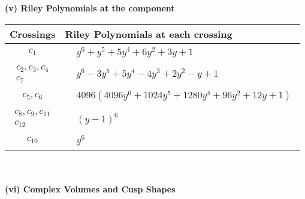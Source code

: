 \documentclass[1p]{elsarticle_modified}
\theoremstyle{definition}
\begin{document}
\newpage\renewcommand{\arraystretch}{1}
\flushleft \textbf{(v) Riley Polynomials at the component}\newline \\
\begin{tabular}{m{50pt}|m{274pt}}
Crossings & \hspace{64pt}Riley Polynomials at each crossing \\
\hline $$\begin{aligned}c_{1}\end{aligned}$$&$\begin{aligned}
&y^6+y^5+5 y^4+6 y^2+3 y+1
\end{aligned}$\\
\hline $$\begin{aligned}c_{2},c_{3},c_{4}\\c_{7}\end{aligned}$$&$\begin{aligned}
&y^6-3 y^5+5 y^4-4 y^3+2 y^2- y+1
\end{aligned}$\\
\hline $$\begin{aligned}c_{5},c_{6}\end{aligned}$$&$\begin{aligned}
&4096(4096 y^6+1024 y^5+1280 y^4+96 y^2+12 y+1)
\end{aligned}$\\
\hline $$\begin{aligned}c_{8},c_{9},c_{11}\\c_{12}\end{aligned}$$&$\begin{aligned}
&(y-1)^6
\end{aligned}$\\
\hline $$\begin{aligned}c_{10}\end{aligned}$$&$\begin{aligned}
&y^6
\end{aligned}$\\
\hline
\end{tabular}\\~\\
\newpage\flushleft \textbf{(vi) Complex Volumes and Cusp Shapes}
\end{document}
